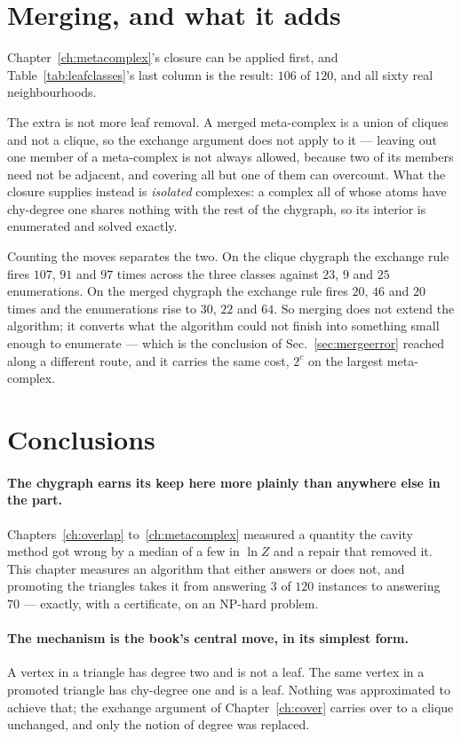 \section{Merging, and what it adds}
\label{sec:mergedleaf}

Chapter~\ref{ch:metacomplex}'s closure can be applied first, and
Table~\ref{tab:leafclasses}'s last column is the result: $106$ of $120$, and
all sixty real neighbourhoods.

The extra is not more leaf removal. A merged meta-complex is a union of cliques
and not a clique, so the exchange argument does not apply to it --- leaving out
one member of a meta-complex is not always allowed, because two of its members
need not be adjacent, and covering all but one of them can overcount. What the
closure supplies instead is \emph{isolated} complexes: a complex all of whose
atoms have chy-degree one shares nothing with the rest of the chygraph, so its
interior is enumerated and solved exactly.

Counting the moves separates the two. On the clique chygraph the exchange rule
fires $107$, $91$ and $97$ times across the three classes against $23$, $9$ and
$25$ enumerations. On the merged chygraph the exchange rule fires $20$, $46$ and
$20$ times and the enumerations rise to $30$, $22$ and $64$. So merging does not
extend the algorithm; it converts what the algorithm could not finish into
something small enough to enumerate --- which is the conclusion of
Sec.~\ref{sec:mergeerror} reached along a different route, and it carries the
same cost, $2^{c}$ on the largest meta-complex.

\section{Conclusions}
\label{sec:cover-tri-conclusions}

\paragraph{The chygraph earns its keep here more plainly than anywhere else in
the part.} Chapters~\ref{ch:overlap} to~\ref{ch:metacomplex} measured a
quantity the cavity method got wrong by a median of a few in $\ln Z$ and a
repair that removed it. This chapter measures an algorithm that either answers
or does not, and promoting the triangles takes it from answering $3$ of $120$
instances to answering $70$ --- exactly, with a certificate, on an NP-hard
problem.

\paragraph{The mechanism is the book's central move, in its simplest form.} A
vertex in a triangle has degree two and is not a leaf. The same vertex in a
promoted triangle has chy-degree one and is a leaf. Nothing was approximated to
achieve that; the exchange argument of Chapter~\ref{ch:cover} carries over to a
clique unchanged, and only the notion of degree was replaced.

